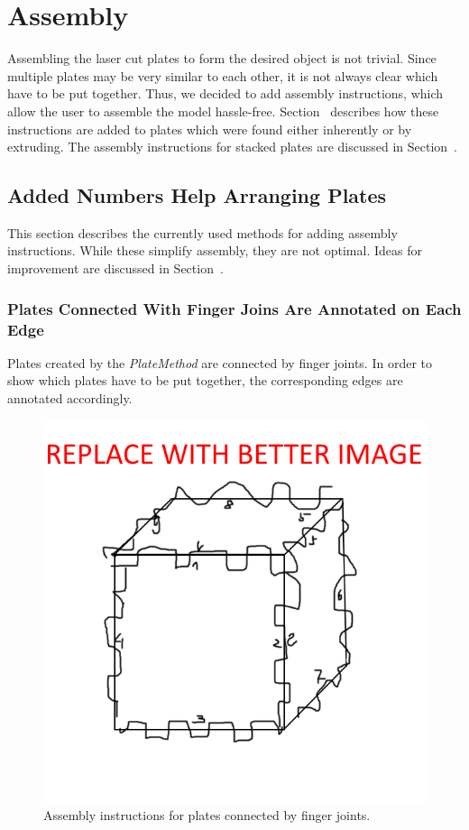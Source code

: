 \documentclass[../ClassicThesis.tex]{subfiles}
\begin{document}
\chapter{Assembly}\label{ch:assembly}

Assembling the laser cut plates to form the desired object is not trivial. Since multiple plates may be very similar to each other, it is not always clear which have to be put together. Thus, we decided to add assembly instructions, which allow the user to assemble the model hassle-free. Section~ describes how these instructions are added to plates which were found either inherently or by extruding. The assembly instructions for stacked plates are discussed in Section~.

\section{Added Numbers Help Arranging Plates}

This section describes the currently used methods for adding assembly instructions. While these simplify assembly, they are not optimal. Ideas for improvement are discussed in Section~.

\subsection{Plates Connected With Finger Joins Are Annotated on Each Edge}\label{sub:assemblyplates}

Plates created by the \emph{PlateMethod} are connected by finger joints. In order to show which plates have to be put together, the corresponding edges are annotated accordingly.

\begin{figure}
    \centering
    \includegraphics[width=0.5\columnwidth]{Images/assembly_plates.png}
    \caption{Assembly instructions for plates connected by finger joints.}
    \label{fig:assemblyplates}
\end{figure}
\end{document}
